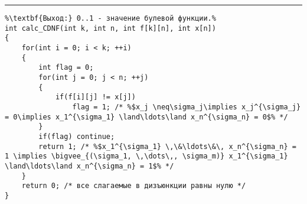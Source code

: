 \documentclass{article}
\begin{document}
\vspace{5pt} \hrule
\begin{lstlisting}[caption={Алгоритм вычисления значения СДНФ}, label=p_137, escapechar=\%]
%\noindent\textbf{Вход:} массив, представляющий СДНФ: f: \textbf{array} [1..k,1..n] \textbf{of} 0..1; множество значений переменных x: \textbf{array} [1..n] \textbf{of} 0..1.\\%
%\textbf{Выход:} 0..1 - значение булевой функции.%
int calc_CDNF(int k, int n, int f[k][n], int x[n])
{
	for(int i = 0; i < k; ++i)
	{
		int flag = 0;
		for(int j = 0; j < n; ++j)
		{
			if(f[i][j] != x[j])
				flag = 1; /* %$x_j \neq\sigma_j\implies x_j^{\sigma_j} = 0\implies x_1^{\sigma_1} \land\ldots\land x_n^{\sigma_n} = 0$% */
		}
		if(flag) continue;
		return 1; /* %$x_1^{\sigma_1} \,\&\ldots\&\, x_n^{\sigma_n} = 1 \implies \bigvee_{(\sigma_1, \,\dots\,, \sigma_m)} x_1^{\sigma_1} \land\ldots\land x_n^{\sigma_n} = 1$% */
	}
	return 0; /* все слагаемые в дизъюнкции равны нулю */
}
\end{lstlisting}
\end{document}
